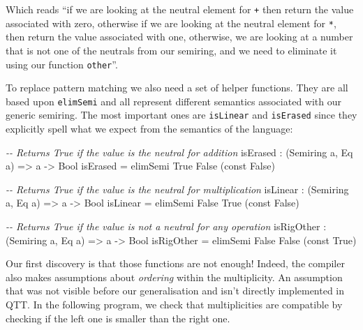 \documentclass[
]{article}
\newenvironment{Shaded}{}{}
\newcommand{\CommentTok}[1]{\textcolor[rgb]{0.38,0.63,0.69}{\textit{#1}}}
\newcommand{\DataTypeTok}[1]{\textcolor[rgb]{0.56,0.13,0.00}{#1}}
\newcommand{\FunctionTok}[1]{\textcolor[rgb]{0.02,0.16,0.49}{#1}}
\newcommand{\NormalTok}[1]{#1}
\newcommand{\OperatorTok}[1]{\textcolor[rgb]{0.40,0.40,0.40}{#1}}
\newcommand{\OtherTok}[1]{\textcolor[rgb]{0.00,0.44,0.13}{#1}}
\begin{document}
Which reads ``if we are looking at the neutral element for \texttt{+}
then return the value associated with zero, otherwise if we are looking
at the neutral element for \texttt{*}, then return the value associated
with one, otherwise, we are looking at a number that is not one of the
neutrals from our semiring, and we need to eliminate it using our
function \texttt{other}''.

To replace pattern matching we also need a set of helper functions. They
are all based upon \texttt{elimSemi} and all represent different
semantics associated with our generic semiring. The most important ones
are \texttt{isLinear} and \texttt{isErased} since they explicitly spell
what we expect from the semantics of the language:

\begin{Shaded}
\begin{Highlighting}[]
\CommentTok{{-}{-} Returns True if the value is the neutral for addition}
\NormalTok{isErased }\OperatorTok{:}\NormalTok{ (}\DataTypeTok{Semiring}\NormalTok{ a, }\DataTypeTok{Eq}\NormalTok{ a) }\OtherTok{=\textgreater{}}\NormalTok{ a }\OtherTok{{-}\textgreater{}} \DataTypeTok{Bool}
\NormalTok{isErased }\OtherTok{=}\NormalTok{ elimSemi }\DataTypeTok{True} \DataTypeTok{False}\NormalTok{ (}\FunctionTok{const} \DataTypeTok{False}\NormalTok{)}

\CommentTok{{-}{-} Returns True if the value is the neutral for multiplication}
\NormalTok{isLinear }\OperatorTok{:}\NormalTok{ (}\DataTypeTok{Semiring}\NormalTok{ a, }\DataTypeTok{Eq}\NormalTok{ a) }\OtherTok{=\textgreater{}}\NormalTok{ a }\OtherTok{{-}\textgreater{}} \DataTypeTok{Bool}
\NormalTok{isLinear }\OtherTok{=}\NormalTok{ elimSemi }\DataTypeTok{False} \DataTypeTok{True}\NormalTok{ (}\FunctionTok{const} \DataTypeTok{False}\NormalTok{)}

\CommentTok{{-}{-} Returns True if the value is not a neutral for any operation}
\NormalTok{isRigOther }\OperatorTok{:}\NormalTok{ (}\DataTypeTok{Semiring}\NormalTok{ a, }\DataTypeTok{Eq}\NormalTok{ a) }\OtherTok{=\textgreater{}}\NormalTok{ a }\OtherTok{{-}\textgreater{}} \DataTypeTok{Bool}
\NormalTok{isRigOther }\OtherTok{=}\NormalTok{ elimSemi }\DataTypeTok{False} \DataTypeTok{False}\NormalTok{ (}\FunctionTok{const} \DataTypeTok{True}\NormalTok{)}
\end{Highlighting}
\end{Shaded}

Our first discovery is that those functions are not enough! Indeed, the
compiler also makes assumptions about \emph{ordering} within the
multiplicity. An assumption that was not visible before our
generalisation and isn't directly implemented in QTT. In the following
program, we check that multiplicities are compatible by checking if the
left one is smaller than the right one.
\end{document}
